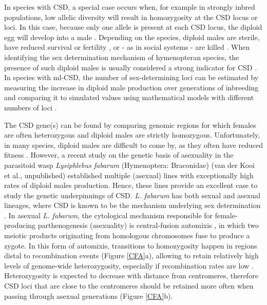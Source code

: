 \documentclass[11pt,a4paper]{report}
\begin{document}
In species with CSD, a special case occurs when, for example in strongly inbred populations, low allelic diversity will result in homozygosity at the CSD locus or loci. In this case, because only one allele is present at each CSD locus, the diploid egg will develop into a male \citep{Whiting1943} . Depending on the species, diploid males are sterile, have reduced survival or fertility \citep{Holloway1999SurvivalBraconidae}, or - as in social systems - are killed \citep{Woyke1963DroneHoneybee}. When identifying the sex determination mechanism of hymenopteran species, the presence of such diploid males is usually considered a strong indicator for CSD \citep{Butcher2000Single-locusIchneumonidae}. In species with ml-CSD, the number of sex-determining loci can be estimated by measuring the increase in diploid male production over generations of inbreeding and comparing it to simulated values using mathematical models with different numbers of loci \citep{Engelstadter2011,Boer2008ExperimentalVestalis}.

The CSD gene(s) can be found by comparing genomic regions for which females are often heterozygous and diploid males are strictly homozygous. Unfortunately, in many species, diploid males are difficult to come by, as they often have reduced fitness \citep{Heimpel2008}. However, a recent study on the genetic basis of asexuality in the parasitoid wasp \textit{Lysiphlebus fabarum} (Hymenoptera: Braconidae) (van der Kooi et al., unpublished) established multiple (asexual) lines with exceptionally high rates of diploid males production. Hence, these lines provide an excellent case to study the genetic underpinnings of CSD. \textit{L. fabarum} has both sexual and asexual lineages, where CSD is known to be the mechanism underlying sex determination \citep{Engelstadter2011}. In asexual \textit{L. fabarum}, the cytological mechanism responsible for female-producing parthenogenesis (asexuality) is central-fusion automixis \citep{Belshaw2003}, in which two meiotic products originating from homologous chromosomes fuse to produce a zygote. In this form of automixis, transitions to homozygosity happen in regions distal to recombination events (Figure \ref{CFA}a), allowing to retain relatively high levels of genome-wide heterozygosity, especially if recombination rates are low \citep{Baudry2004Whole-genomeAnalysis}. Heterozygosity is expected to decrease with distance from centromeres, therefore CSD loci that are close to the centromeres should be retained more often when passing through asexual generations (Figure \ref{CFA}b). 
\end{document}
